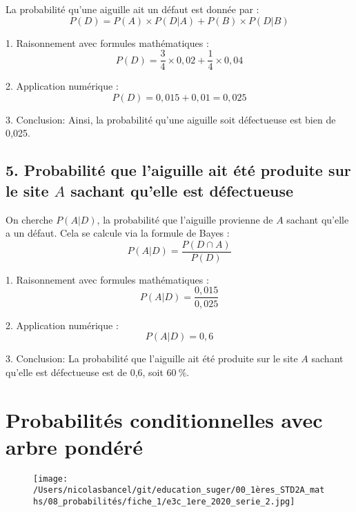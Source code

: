 \documentclass{exam}
\begin{document}
\begin{solution}
La probabilité qu'une aiguille ait un défaut est donnée par :
\[
P(D) = P(A) \times P(D|A) + P(B) \times P(D|B)
\]

1. Raisonnement avec formules mathématiques :
   \[
   P(D) = \frac{3}{4} \times 0,02 + \frac{1}{4} \times 0,04
   \]

2. Application numérique :
   \[
   P(D) = 0,015 + 0,01 = 0,025
   \]

3. Conclusion:
   Ainsi, la probabilité qu'une aiguille soit défectueuse est bien de 0,025.

\subsection*{5. Probabilité que l'aiguille ait été produite sur le site $A$ sachant qu'elle est défectueuse}

On cherche \( P(A|D) \), la probabilité que l'aiguille provienne de $A$ sachant qu'elle a un défaut. Cela se calcule via la formule de Bayes :
\[
P(A|D) = \frac{P(D \cap A)}{P(D)}
\]

1. Raisonnement avec formules mathématiques :
   \[
   P(A|D) = \frac{0,015}{0,025}
   \]

2. Application numérique :
   \[
   P(A|D) = 0,6
   \]

3. Conclusion:
   La probabilité que l'aiguille ait été produite sur le site $A$ sachant qu'elle est défectueuse est de 0,6, soit \( \SI{60}{\percent} \).

\end{solution}



\section*{Probabilités conditionnelles avec arbre pondéré}

    \begin{figure}[H]
      \centering
      \texttt{[image: /Users/nicolasbancel/git/education\_suger/00\_1ères\_STD2A\_maths/08\_probabilités/fiche\_1/e3c\_1ere\_2020\_serie\_2.jpg]}
      \captionsetup{labelformat=empty}
    \end{figure}
\end{document}
